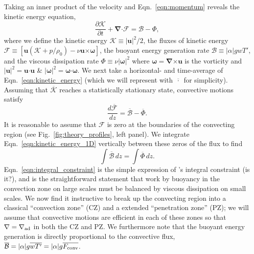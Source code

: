 \documentclass{aastex631}
\newcommand{\gradad}{\ensuremath{\nabla_{\rm{ad}}}}
\newcommand{\justgrad}{\ensuremath{\nabla}}
\newcommand{\Fconv}{\ensuremath{F_{\rm{conv}}}}
\renewcommand{\vec}[1]{\boldsymbol{#1}}
\renewcommand{\dot}{\vec{\cdot}}
\renewcommand{\bar}[1]{\overline{#1}}
\newcommand{\grad}{\vec{\nabla}}
\newcommand{\cross}{\vec{\times}}
\begin{document}
Taking an inner product of the velocity and Eqn.~\ref{eqn:momentum} reveals the kinetic energy equation,
\begin{equation}
\frac{\partial \mathcal{K}}{\partial t}
+ \grad\dot\mathcal{F}
= \mathcal{B} - \Phi,
\label{eqn:kinetic_energy}
\end{equation}
where we define the kinetic energy $\mathcal{K} \equiv |\vec{u}|^2/2$, the fluxes of kinetic energy $\mathcal{F} \equiv \left[\vec{u}(\mathcal{K} + p/\rho_0) - \nu\vec{u}\cross\vec{\omega} \right]$, the buoyant energy generation rate $\mathcal{B} \equiv |\alpha| g w T'$, and the viscous dissipation rate $\Phi \equiv \nu |\vec{\omega}|^2$ where $\vec{\omega} = \grad\cross\vec{u}$ is the vorticity and $|\vec{u}|^2 = \vec{u}\dot\vec{u}$ \& $|\vec{\omega}|^2 = \vec{\omega}\dot\vec{\omega}$.
We next take a horizontal- and time-average of Eqn.~\ref{eqn:kinetic_energy} (which we will represent with $\bar{\,\cdot\,}$ for simplicity).
Assuming that $\bar{\mathcal{K}}$ reaches a statistically stationary state, convective motions satisfy
\begin{equation}
\frac{d\bar{\mathcal{F}}}{dz} = \bar{\mathcal{B}} - \bar{\Phi}.
\label{eqn:kinetic_energy_1D}
\end{equation}
It is reasonable to assume that $\mathcal{F}$ is zero at the boundaries of the convecting region (see Fig.~\ref{fig:theory_profiles}, left panel).
We integrate Eqn.~\ref{eqn:kinetic_energy_1D} vertically between these zeros of the flux to find
\begin{equation}
\int \bar{\mathcal{B}}\,dz = \int \bar{\Phi}\,dz.
\label{eqn:integral_constraint}
\end{equation}
Eqn.~\ref{eqn:integral_constraint} is the simple expression of \citet{roxburgh1989}'s integral constraint (is it?), and is the straightforward statement that work by buoyancy in the convection zone on large scales must be balanced by viscous dissipation on small scales.
We now find it instructive to break up the convecting region into a classical ``convection zone'' (CZ) and a extended ``penetration zone'' (PZ); we will assume that convective motions are efficient in each of these zones so that $\justgrad = \gradad$ in both the CZ and PZ.
We furthermore note that the buoyant energy generation is directly proportional to the convective flux, $\bar{\mathcal{B}} = |\alpha|g\bar{w T'} = |\alpha| g \bar{\Fconv}$.
\end{document}
